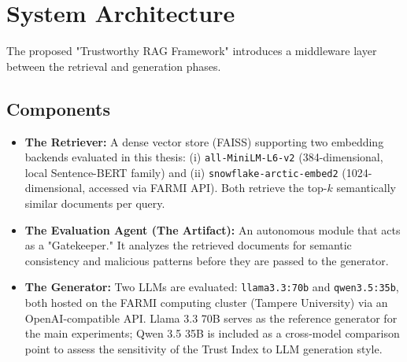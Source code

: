 \section{System Architecture}
\label{sec:system_architecture}

The proposed "Trustworthy RAG Framework" introduces a middleware layer between the retrieval and generation phases.



\subsection{Components}
\begin{itemize}
    \item \textbf{The Retriever:} A dense vector store (FAISS) supporting two embedding backends evaluated in this thesis: (i) \texttt{all-MiniLM-L6-v2} (384-dimensional, local Sentence-BERT family) and (ii) \texttt{snowflake-arctic-embed2} (1024-dimensional, accessed via FARMI API). Both retrieve the top-$k$ semantically similar documents per query.
    \item \textbf{The Evaluation Agent (The Artifact):} An autonomous module that acts as a "Gatekeeper." It analyzes the retrieved documents for semantic consistency and malicious patterns before they are passed to the generator.
    \item \textbf{The Generator:} Two LLMs are evaluated: \texttt{llama3.3:70b} and \texttt{qwen3.5:35b}, both hosted on the FARMI computing cluster (Tampere University) via an OpenAI-compatible API. Llama 3.3 70B serves as the reference generator for the main experiments; Qwen 3.5 35B is included as a cross-model comparison point to assess the sensitivity of the Trust Index to LLM generation style.
\end{itemize}

